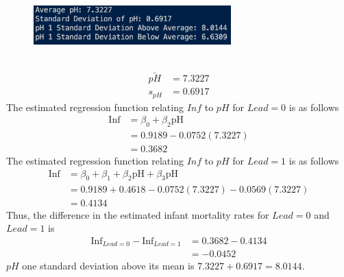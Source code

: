 \documentclass{uofa-eng-assignment}
\begin{document}
\begin{enumerate}
\begin{enumerate}
\begin{enumerate}
                          \begin{figure}[h]
                              \centering
                              \includegraphics[width=0.68\textwidth]{p1-b-v.png}
                          \end{figure} \\
                          \begin{align*}
                              \bar{pH} & = 7.3227 \\
                              s_{pH}   & = 0.6917
                          \end{align*}
                          The estimated regression function relating $Inf$ to $pH$ for $Lead = 0$ is as
                          follows
                          \begin{align*}
                              \text{Inf} & = \beta_0 + \beta_2\text{pH} \\
                                         & = 0.9189 - 0.0752(7.3227)    \\
                                         & = 0.3682
                          \end{align*}
                          The estimated regression function relating $Inf$ to $pH$ for $Lead = 1$ is
                          as follows
                          \begin{align*}
                              \text{Inf} & = \beta_0 + \beta_1 + \beta_2\text{pH} + \beta_3\text{pH} \\
                                         & = 0.9189 + 0.4618 - 0.0752(7.3227) - 0.0569(7.3227)       \\
                                         & = 0.4134
                          \end{align*}
                          Thus, the difference in the estimated infant mortality rates for $Lead = 0$ and $Lead = 1$ is
                          \begin{align*}
                              \text{Inf}_{Lead = 0} - \text{Inf}_{Lead = 1} & = 0.3682 - 0.4134 \\
                                                                            & = -0.0452
                          \end{align*}
                          $pH$ one standard deviation above its mean is $7.3227 + 0.6917 = 8.0144$.

\end{enumerate}
\end{enumerate}
\end{enumerate}
\end{document}
